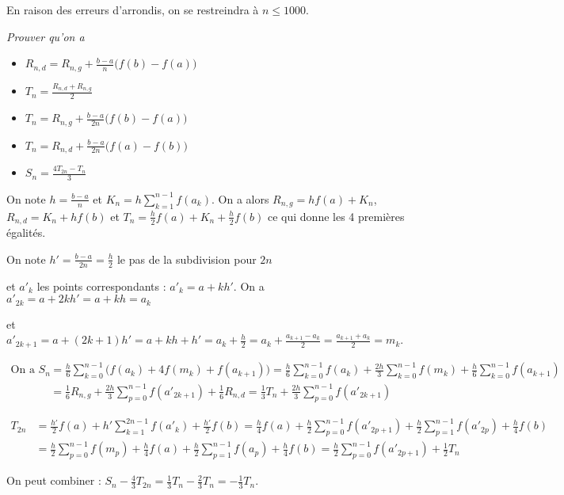 En raison des erreurs d'arrondis, on se restreindra à $n\le 1000$.
\begin{Exercise}[title=Lien entre les expressions]\it
Prouver qu'on a 
\begin{itemize}
    \item $\displaystyle R_{n,d} = R_{n,g} + \frac{b-a}n\bigl(f(b) - f(a)\bigr)$
    \item $\displaystyle T_n = \frac{R_{n,d} + R_{n,g}}2$
    \item $\displaystyle T_n = R_{n,g} + \frac{b-a}{2n}\bigl(f(b) - f(a)\bigr)$
    \item $\displaystyle T_n = R_{n,d} + \frac{b-a}{2n}\bigl(f(a) - f(b)\bigr)$
    \item $\displaystyle S_n = \frac{4T_{2n} -T_n}3$
\end{itemize}
\end{Exercise}
\begin{Answer} 

On note $\displaystyle h = \frac{b-a}{n}$ et $\displaystyle K_n = h\sum_{k=1}^{n-1} f(a_k)$.
On a alors $R_{n,g} = hf(a) + K_n$, $R_{n,d} = K_n + hf(b)$ et $T_n = \frac h2 f(a)+ K_n+\frac h2 f(b)$ ce qui donne les 4 premières égalités.

On note $\displaystyle h' = \frac{b-a}{2n}=\frac h2$ le pas de la subdivision pour $2n$ 

et $a'_k$ les points correspondants : $\displaystyle a'_k = a+kh'$.
On a $a'_{2k} = a+2kh'=a+kh = a_k$ 

et $\displaystyle a'_{2k+1} = a+(2k+1)h' = a+kh + h' = a_k + \frac h2
=a_k + \frac {a_{k+1}-a_k}2 = \frac {a_{k+1}+a_k}2 = m_k$.

\begin{align*}
\text{On a } S_n
& 
= \frac h6\sum_{k=0}^{n-1}\bigl(f(a_k) + 4 f(m_k) +f(a_{k+1})\bigr)
= \frac h6\sum_{k=0}^{n-1}f(a_k) + \frac{2h}3\sum_{k=0}^{n-1}f(m_k) + \frac h6\sum_{k=0}^{n-1}f(a_{k+1})
\\&
=\frac 16 R_{n,g} + \frac{2h}3\sum_{p=0}^{n-1}f(a'_{2k+1}) +\frac 16 R_{n,d}
=\frac 13 T_n + \frac{2h}3\sum_{p=0}^{n-1}f(a'_{2k+1})
\end{align*}

\begin{align*}
T_{2n}
& 
= \frac{h'}2f(a) + h'\sum_{k=1}^{2n-1}f(a'_k) + \frac{h'}2f(b)
= \frac{h}4f(a) + \frac h2\sum_{p=0}^{n-1}f(a'_{2p+1}) + \frac h2\sum_{p=1}^{n-1}f(a'_{2p}) + \frac{h}4f(b)
\\&
= \frac h2\sum_{p=0}^{n-1}f(m_p) + \frac{h}4f(a) + \frac h2\sum_{p=1}^{n-1}f(a_p)  + \frac{h}4f(b)
= \frac h2\sum_{p=0}^{n-1}f(a'_{2p+1}) + \frac 12T_n 
\end{align*}

On peut combiner : $S_n - \frac 43 T_{2n} = \frac 13 T_n - \frac 23 T_n = - \frac 13 T_n$.


\end{Answer}


